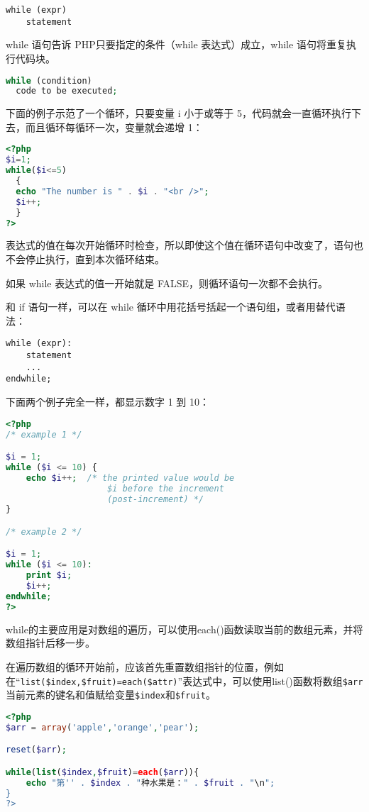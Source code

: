\begin{verbatim}
while (expr)
    statement
\end{verbatim}

while 语句告诉 PHP只要指定的条件（while 表达式）成立，while 语句将重复执行代码块。


\begin{lstlisting}[language=PHP]
while (condition)
  code to be executed;
\end{lstlisting}

下面的例子示范了一个循环，只要变量 i 小于或等于 5，代码就会一直循环执行下去，而且循环每循环一次，变量就会递增 1：

\begin{lstlisting}[language=PHP]
<?php 
$i=1;
while($i<=5)
  {
  echo "The number is " . $i . "<br />";
  $i++;
  }
?>
\end{lstlisting}

表达式的值在每次开始循环时检查，所以即使这个值在循环语句中改变了，语句也不会停止执行，直到本次循环结束。

如果 while 表达式的值一开始就是 FALSE，则循环语句一次都不会执行。

和 if 语句一样，可以在 while 循环中用花括号括起一个语句组，或者用替代语法：

\begin{verbatim}
while (expr):
    statement
    ...
endwhile;
\end{verbatim}

下面两个例子完全一样，都显示数字 1 到 10：

\begin{lstlisting}[language=PHP]
<?php
/* example 1 */

$i = 1;
while ($i <= 10) {
    echo $i++;  /* the printed value would be
                    $i before the increment
                    (post-increment) */
}

/* example 2 */

$i = 1;
while ($i <= 10):
    print $i;
    $i++;
endwhile;
?>
\end{lstlisting}

while的主要应用是对数组的遍历，可以使用each()函数读取当前的数组元素，并将数组指针后移一步。


在遍历数组的循环开始前，应该首先重置数组指针的位置，例如在“\texttt{list(\$index,\$fruit)=each(\$attr)}”表达式中，可以使用list()函数将数组\texttt{\$arr}当前元素的键名和值赋给变量\texttt{\$index}和\texttt{\$fruit}。

\begin{lstlisting}[language=PHP]
<?php
$arr = array('apple','orange','pear');

reset($arr);

while(list($index,$fruit)=each($arr)){
	echo "第'' . $index . "种水果是：" . $fruit . "\n";
}
?>
\end{lstlisting}


